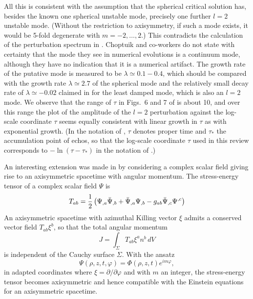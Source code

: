 \documentclass{article}
\begin{document}
All this is consistent with the assumption that the spherical critical
solution has, besides the known one spherical unstable mode, precisely
one further $l=2$ unstable mode. (Without the restriction to
axisymmetry, if such a mode exists, it would be 5-fold degenerate with
$m=-2,\dots,2$.)  This contradicts the calculation of the perturbation
spectrum in \cite{MartinGundlach}. Choptuik and co-workers do not
state with certainty that the mode they see in numerical evolutions is
a continuum mode, although they have no indication that it is a
numerical artifact. The growth rate of the putative mode is measured
to be $\lambda\simeq 0.1-0.4$, which should be compared with the
growth rate $\lambda\simeq 2.7$ of the spherical mode and the
relatively small decay rate of $\lambda\simeq -0.02$ claimed in
\cite{MartinGundlach} for the least damped mode, which is also an
$l=2$ mode. We observe that the range of $\tau$ in Figs.~6 and 7 of
\cite{Choptuik_axisymmetry} is about 10, and over this range the plot
of the amplitude of the $l=2$ perturbation against the log-scale
coordinate $\tau$ seems equally consistent with linear growth in
$\tau$ as with exponential growth. (In the notation of
\cite{Choptuik_axisymmetry}, $\tau$ denotes proper time and $\tau_*$
the accumulation point of echos, so that the log-scale coordinate
$\tau$ used in this review corresponds to $-\ln(\tau-\tau_*)$ in the
notation of \cite{Choptuik_axisymmetry}.)

An interesting extension was made in
\cite{ChoptuikHirschmannLieblingPretorius} by considering a complex
scalar field giving rise to an axisymmetric spacetime with angular
momentum. The stress-energy tensor of a complex scalar field $\Psi$ is
\begin{equation}
T_{ab}={1\over2}\left(\Psi_{,a}\bar\Psi_{,b}+\bar\Psi_{,a}\Psi_{,b}
- g_{ab}\bar\Psi_{,c}\Psi^{,c}\right)
\end{equation}
An axisymmetric spacetime with azimuthal Killing vector $\xi$ admits a
conserved vector field $T_{ab}\xi^b$, so that the total angular momentum
\begin{equation}
J=\int_\Sigma T_{ab}\xi^a n^b \,dV
\end{equation}
is independent of the Cauchy surface $\Sigma$. With the ansatz
\begin{equation} \label{m1ansatz}
\Psi(\rho,z,t,\varphi)=\Phi(\rho,z,t)e^{im\varphi},
\end{equation}
in adapted coordinates where $\xi=\partial/\partial \varphi$ and with
$m$ an integer, the stress-energy tensor becomes axisymmetric and
hence compatible with the Einstein equations for an axisymmetric spacetime. 
\end{document}
